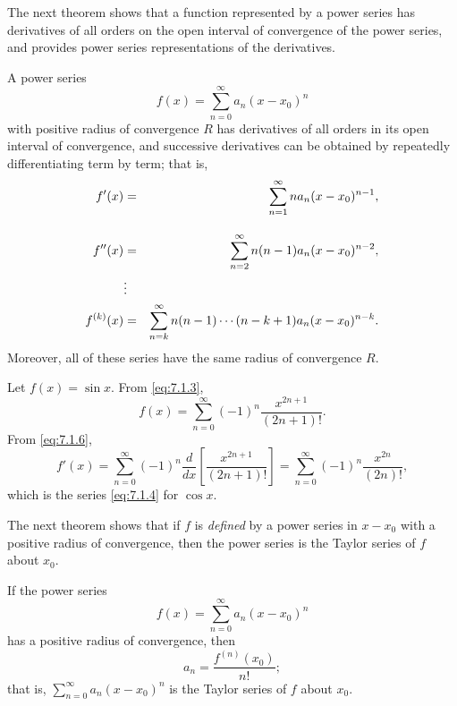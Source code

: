 The next theorem shows that a function represented by a power series has derivatives of all orders
on the open interval of convergence of the power series, and provides power series representations
of the derivatives.

\begin{theorem}
  \color{blue}
  \label{thmtype:7.1.4} A power series
  \[
    f(x)=\sum_{n=0}^{\infty}a_{n}(x-x_{0})^{n}
  \]
  with positive radius of convergence $R$ has derivatives of all orders in its open interval of
  convergence, and successive derivatives can be obtained by repeatedly differentiating term by
  term; that is,
  \begin{eqnarray}
    f'(x)      & =      & \displaystyle{\sum_{n=1}^{\infty}na_{n}(x-x_{0})^{n-1}}\label{eq:7.1.6},      \\[10pt]
    f''(x)     & =      & \displaystyle{\sum_{n=2}^{\infty}n(n-1)a_{n}(x-x_{0})^{n-2}},\label{eq:7.1.7} \\
               & \vdots & \nonumber                                                            \\
    f^{(k)}(x) & =      & \displaystyle{\sum_{n=k}^{\infty}n(n-1)\cdots(n-k+1)a_{n}(x-x_{0})^{n-k}}\label{eq:7.1.8}.
  \end{eqnarray}
  Moreover, all of these series have the same radius of convergence $R$.
\end{theorem}

\begin{example}
  \label{example:7.1.2} \rm Let $f(x)=\sin x$. From \eqref{eq:7.1.3},
  \[
    f(x)=\sum_{n=0}^{\infty}(-1)^{n}\frac{x^{2n+1}}{(2n+1)!}.
  \]
  From \eqref{eq:7.1.6},
  \[
    f'(x)=\sum_{n=0}^{\infty}(-1)^{n}\frac{d}{dx}\left[\frac{x^{2n+1}}{(2n+1)!}\right]= \sum_{n=0}^{\infty}(-1)^{n}\frac{x^{2n}}{(2n)!},
  \]
  which is the series \eqref{eq:7.1.4} for $\cos x$.
\end{example}


\noindent
The next theorem shows that if $f$ is {\color{blue}\it defined\/} by a power series in $x-x_{0}$
with a positive radius of convergence, then the power series is the Taylor series of $f$ about
$x_{0}$.

\begin{theorem}
  \color{blue}
  \label{thmtype:7.1.5} If the power series
  \[
    f(x)=\sum_{n=0}^{\infty}a_{n}(x-x_{0})^{n}
  \]
  has a positive radius of convergence, then
  \begin{equation}
    \label{eq:7.1.9}a_{n}=\frac{f^{(n)}(x_{0})}{n!};
  \end{equation}
  that is, $\sum_{n=0}^{\infty}a_{n}(x-x_{0})^{n}$ is the Taylor series of $f$ about $x_{0}$.
\end{theorem}

